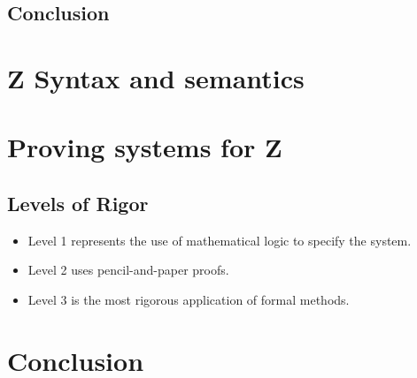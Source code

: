 \subsection{Conclusion}

\section{Z Syntax and semantics}

\section{Proving systems for Z}

\subsection{Levels of Rigor}

\begin{itemize}
\item Level 1 represents the use of mathematical logic to specify the system.
\item Level 2 uses pencil-and-paper proofs.
\item Level 3 is the most rigorous application of formal methods.

\end{itemize}

\section{Conclusion}